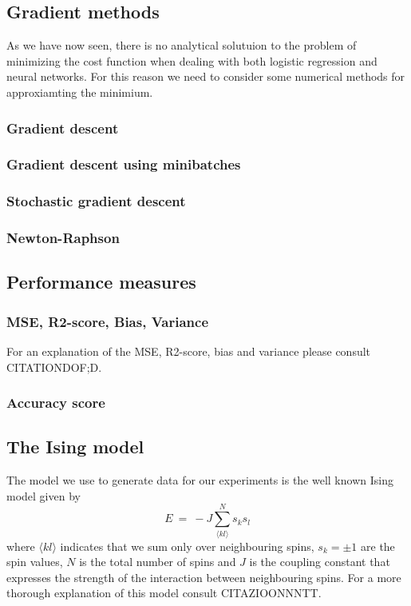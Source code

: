 \documentclass[a4paper,english]{article}
\begin{document}
\subsection{Gradient methods}
As we have now seen, there is no analytical solutuion to the problem
of minimizing the cost function when dealing with both logistic regression
and neural networks. For this reason we need to consider some numerical 
methods for approxiamting the minimium.

\subsubsection{Gradient descent}
\subsubsection{Gradient descent using minibatches}
\subsubsection{Stochastic gradient descent}
\subsubsection{Newton-Raphson}

\subsection{Performance measures}
\subsubsection{MSE, R2-score, Bias, Variance}
For an explanation of the MSE, R2-score, bias and variance please
consult CITATIONDOF;D.
\subsubsection{Accuracy score}

\subsection{The Ising model}
The model we use to generate data for our experiments is the well known
Ising model given by
\begin{equation}
    E \ = \ - J \sum_{\langle kl \rangle}^N s_k s_l
\end{equation}
where $\langle kl \rangle$ indicates that we sum only over neighbouring
spins, 
$s_k = \pm 1$ are the spin values, $N$ is the total number of spins and $J$ is the coupling 
constant that expresses the strength of the interaction between 
neighbouring spins. For a more thorough explanation of this model
consult CITAZIOONNNTT.
\end{document}
